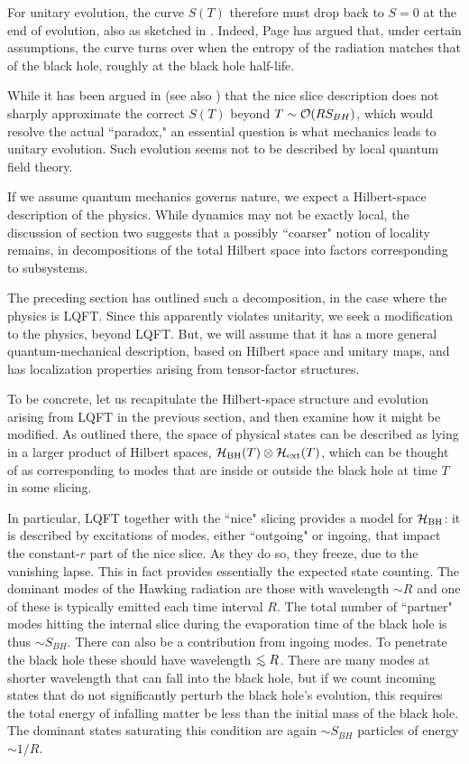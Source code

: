 For unitary evolution, the curve $S(T)$ therefore must drop back to $S=0$ at the end of evolution, also as sketched in \entropfig.  Indeed, Page  has argued that, under certain assumptions, the curve turns over when the entropy of the radiation matches that of the black hole, roughly at the black hole half-life.

While it has been argued in  (see also \GiddingsSJ) that the nice slice description does not sharply approximate the correct $S(T)$ beyond $T\sim {\cal O}(R S_{BH})$, which would resolve the actual ``paradox," an essential question is what mechanics leads to unitary evolution.  Such evolution seems not to be described by local quantum field theory.

If we assume quantum mechanics governs nature, we expect a Hilbert-space description of the physics.  While dynamics may not be exactly local, the discussion of section two suggests that a possibly ``coarser" notion of locality remains, in decompositions of the total Hilbert space into factors corresponding to subsystems.

The preceding section has outlined such a decomposition, in the case where the physics is LQFT.  Since this apparently violates unitarity, we seek a modification to the physics, beyond LQFT.  But, we will assume that it has a more general quantum-mechanical description, based on Hilbert space and unitary maps, and has localization properties arising from tensor-factor structures.

To be concrete, let us recapitulate  the Hilbert-space structure and evolution arising from LQFT in the previous section, and then examine how it might be modified.  As outlined there, the space of physical states can be described as lying in a larger product of Hilbert spaces, $ {{\cal H}_{\rm BH}}(T)\otimes{{\cal H}_{\rm ext}}(T)$, which can be thought of as corresponding to modes that are inside or outside the black hole at time $T$ in some slicing.  


In particular, LQFT together with the ``nice" slicing provides a model for ${{\cal H}_{\rm BH}}$: it is described by excitations of modes, either ``outgoing" or ingoing, that impact the constant-$r$ part of the nice slice.  As they do so, they freeze, due to the vanishing lapse.  This in fact provides essentially the expected state counting.  The dominant modes of the Hawking radiation are those with wavelength $\sim R$ and one of these is typically emitted each time interval  $R$.  The total number of ``partner" modes hitting the internal slice during the evaporation time of the black hole is thus $\sim S_{BH}$.  There can also be a contribution from ingoing modes.  To penetrate the black hole these should have wavelength $\roughly< R$.  There are many modes at shorter wavelength that can fall into the black hole, but if we count incoming states that do not significantly perturb the black hole's evolution, this requires the total energy of infalling matter be less than the initial mass of the black hole.  The dominant states saturating this condition are again $\sim S_{BH}$ particles of energy $\sim 1/R$.  

